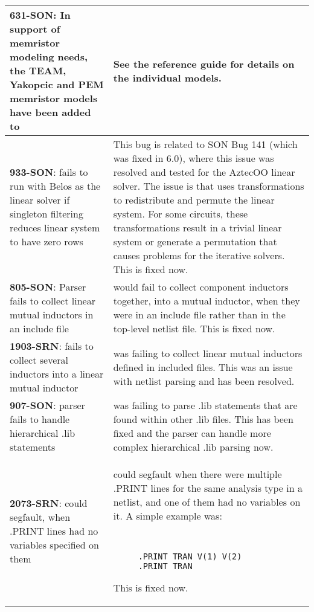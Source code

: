 {\begin{longtable}[h] {>{\raggedright\small}m{2in}|>{\raggedright\let\\\tabularnewline\small}m{3.5in}}
     \textbf{631-SON}: In support of memristor modeling needs, the TEAM, Yakopcic
     and PEM memristor models have been added to \Xyce{}  & See the reference 
     guide for details on the individual models. \\ \hline

     \textbf{933-SON}: \Xyce{} fails to run with Belos as the linear solver if singleton
     filtering reduces linear system to have zero rows & This bug is related to SON Bug
     141 (which was fixed in \Xyce{} 6.0), where this issue was resolved and tested for the
     AztecOO linear solver.  The issue is that \Xyce{} uses transformations to redistribute
     and permute the linear system.  For some circuits, these transformations result in
     a trivial linear system or generate a permutation that causes problems for the 
     iterative solvers.  This is fixed now. \\ \hline

     \textbf{805-SON}: Parser fails to collect linear mutual inductors in an include file &
     \Xyce{} would fail to collect component inductors together, into a mutual inductor, when
     they were in an include file rather than in the top-level netlist file.  This is fixed now.
     \\ \hline

     \textbf{1903-SRN}: \Xyce{} fails to collect several inductors into a linear mutual inductor &
     \Xyce{} was failing to collect linear mutual inductors defined in included files.  This was an
     issue with netlist parsing and has been resolved. \\ \hline

     \textbf{907-SON}: \Xyce{} parser fails to handle hierarchical .lib statements &
     \Xyce{} was failing to parse .lib statements that are found within other .lib files.
     This has been fixed and the parser can handle more complex hierarchical
     .lib parsing now.  \\ \hline

     \textbf{2073-SRN}: \Xyce{} could segfault, when .PRINT lines had no variables specified on them &
     \Xyce{} could segfault when there were multiple .PRINT lines for the same analysis 
     type in a netlist, and one of them had no variables on it. A simple example was:
     {\tt
     \begin{verbatim}
     .PRINT TRAN V(1) V(2)
     .PRINT TRAN
     \end{verbatim}
     }
     This is fixed now.\\ \hline


\end{longtable}}
